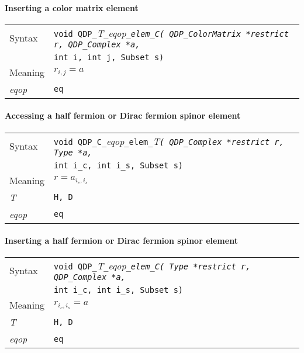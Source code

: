 \documentclass{article}
\newcommand{\tComplex}{QDP\ttdash Complex }
\newcommand{\tColorMatrix}{QDP\ttdash ColorMatrix }
\newcommand{\namespace}{QDP}
\newcommand{\ttdash}{{\tt \_}}
\newcommand{\itt}{\it T}
\newcommand{\extraarg}{, Subset s}
\begin{document}
\paragraph{Inserting a color matrix element}

\begin{flushleft}
  \begin{tabular}{|l|l|}
  \hline
  Syntax      & {\tt void \namespace}\ttdash\itt\ttdash{\it eqop}\ttdash{\tt elem}\ttdash{\tt C( \tColorMatrix *restrict r, \tComplex *a,}\\
              & {\tt int i, int j\extraarg)} \\
  \hline
  Meaning     & $r_{i,j} = a$\\
  \hline
  {\it eqop}  & {\tt eq} \\
  \hline
  \end{tabular}
\end{flushleft}

\paragraph{Accessing a half fermion or Dirac fermion spinor element}

\begin{flushleft}
  \begin{tabular}{|l|l|}
  \hline
  Syntax      & {\tt void \namespace}\ttdash{\tt C}\ttdash{\it eqop}\ttdash{\tt elem}\ttdash\itt{\tt ( \tComplex *restrict r, Type *a,}\\
              & {\tt int i\_c, int i\_s\extraarg)} \\
  \hline
  Meaning     & $r = a_{i_c,i_s}$\\
  \hline
  \itt        & {\tt H, D} \\
  \hline
  {\it eqop}  & {\tt eq} \\
  \hline
  \end{tabular}
\end{flushleft}

\paragraph{Inserting a half fermion or Dirac fermion spinor element}

\begin{flushleft}
  \begin{tabular}{|l|l|}
  \hline
  Syntax      & {\tt void \namespace}\ttdash\itt\ttdash{\it eqop}\ttdash{\tt elem}\ttdash{\tt C( Type *restrict r, \tComplex *a, }\\
              & {\tt int i\_c, int i\_s\extraarg)} \\
  \hline
  Meaning     & $r_{i_c,i_s} = a$\\
  \hline
  \itt        & {\tt H, D} \\
  \hline
  {\it eqop}  & {\tt eq} \\
  \hline
  \end{tabular}
\end{flushleft}
\end{document}

